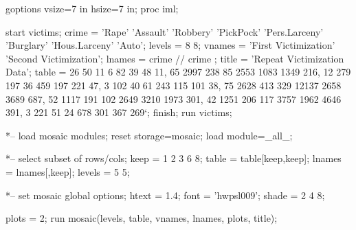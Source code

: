 \begin{listing}
goptions vsize=7 in hsize=7 in;
proc iml;
 
start victims;
   crime = {'Rape' 'Assault' 'Robbery' 'PickPock' 'Pers.Larceny'
            'Burglary' 'Hous.Larceny' 'Auto'};
   levels = {8 8};
   vnames = {'First Victimization' 'Second Victimization'};
   lnames = crime // crime ;
   title  = 'Repeat Victimization Data';
   table = {  26   50  11   6    82   39   48   11,
              65 2997 238  85  2553 1083 1349  216,
              12  279 197  36   459  197  221   47,
               3  102  40  61   243  115  101   38,
              75 2628 413 329 12137 2658 3689  687,
              52 1117 191 102  2649 3210 1973  301,
              42 1251 206 117  3757 1962 4646  391,
               3  221  51  24   678  301  367  269}`;
   finish;
   run victims;

   *-- load mosaic modules;
   reset storage=mosaic;
   load module=_all_;
 
   *-- select subset of rows/cols;
   keep = {1 2 3 6 8};
   table = table[keep,keep];
   lnames = lnames[,keep];
   levels = {5 5};

   *-- set mosaic global options;
   htext = 1.4;
   font = 'hwpsl009';
   shade = {2 4 8};

   plots = {2};
   run mosaic(levels, table, vnames, lnames, plots, title);
 
\end{listing}
